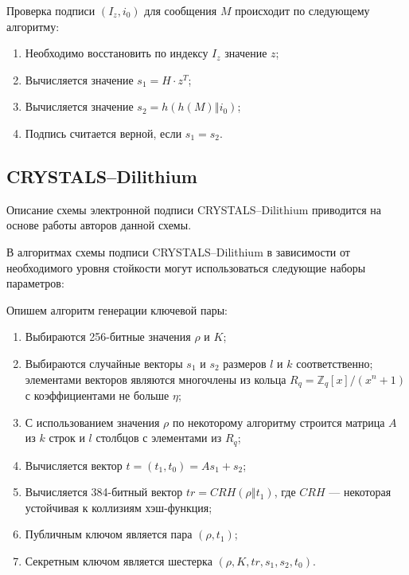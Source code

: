 \documentclass{./civarticle}
\begin{document}
Проверка подписи $(I_z, i_0)$ для сообщения $M$ происходит по следующему алгоритму:

\begin{enumerate}
    \item Необходимо восстановить по индексу $I_z$ значение $z$;
    \item Вычисляется значение $s_1 = H \cdot z^{T}$;
    \item Вычисляется значение $s_2 = h(h(M) \mathbin\Vert i_0)$;
    \item Подпись считается верной, если $s_1 = s_2$.
\end{enumerate}


\subsection{CRYSTALS–Dilithium}

Описание схемы электронной подписи CRYSTALS–Dilithium приводится на основе работы \cite{crystals} авторов данной схемы.

В алгоритмах схемы подписи CRYSTALS–Dilithium в зависимости от необходимого уровня стойкости могут использоваться следующие наборы параметров: 

\begin{figure}[h!]
\end{figure}

Опишем алгоритм генерации ключевой пары:

\begin{enumerate}
    \item Выбираются 256-битные значения $\rho$ и $K$;
    \item Выбираются случайные векторы $s_1$ и $s_2$ размеров $l$ и $k$ соответственно; элементами векторов являются многочлены из кольца $R_q = \mathbb{Z}_q[x]/(x^n + 1)$ с коэффициентами не больше $\eta$;
    \item С использованием значения $\rho$ по некоторому алгоритму строится матрица $A$ из $k$ строк и $l$ столбцов с элементами из $R_q$;
    \item Вычисляется вектор $t = (t_1, t_0) = As_1 + s_2$;
    \item Вычисляется 384-битный вектор $tr = CRH(\rho \mathbin\Vert t_1)$, где $CRH$ --- некоторая устойчивая к коллизиям хэш-функция;
    \item Публичным ключом является пара $(\rho, t_1)$;
    \item Секретным ключом является шестерка $(\rho, K, tr, s_1, s_2, t_0)$.
\end{enumerate}
\end{document}
